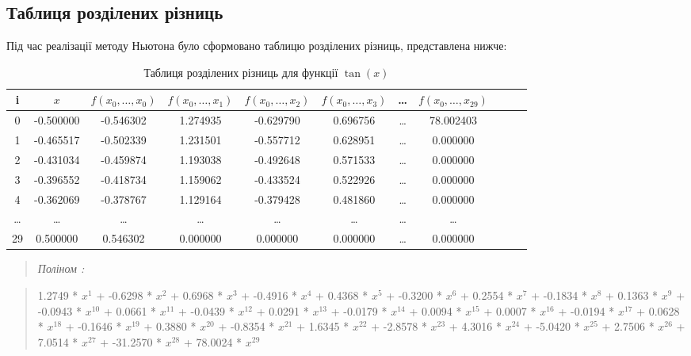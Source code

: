 \documentclass[a4paper, 12pt]{article}
\begin{document}
\subsection{Таблиця розділених різниць}

Під час реалізації методу Ньютона було сформовано таблицю розділених різниць, представлена нижче:

\begin{table}[h]
    \centering
    \begin{tabular}{|c|c|c|c|c|c|c|c|c|c|c|}
        \hline
        \textbf{i} & \( x \) & \( f(x_0, \ldots, x_0) \) & \( f(x_0, \ldots, x_1) \) & \( f(x_0, \ldots, x_2) \) & \( f(x_0, \ldots, x_3) \) & \ldots & \( f(x_0, \ldots, x_{29}) \) \\
        \hline
        0 & -0.500000 & -0.546302 & 1.274935 & -0.629790 & 0.696756 & \ldots & 78.002403 \\
        1 & -0.465517 & -0.502339 & 1.231501 & -0.557712 & 0.628951 & \ldots & 0.000000 \\
        2 & -0.431034 & -0.459874 & 1.193038 & -0.492648 & 0.571533 & \ldots & 0.000000 \\
        3 & -0.396552 & -0.418734 & 1.159062 & -0.433524 & 0.522926 & \ldots & 0.000000 \\
        4 & -0.362069 & -0.378767 & 1.129164 & -0.379428 & 0.481860 & \ldots & 0.000000 \\
        \hline
		\ldots & \ldots & \ldots & \ldots & \ldots & \ldots & \ldots & \ldots \\
        \hline
        29 & 0.500000 & 0.546302 & 0.000000 & 0.000000 & 0.000000 & \ldots & 0.000000 \\
        \hline
    \end{tabular}
    \caption{Таблиця розділених різниць для функції \( \tan(x) \)}
\end{table}

\begin{quote}
\textit{Поліном :} 
\end{quote}

\begin{quote}
1.2749 * \( x^1 \) + -0.6298 * \( x^2 \) + 0.6968 * \( x^3 \) + -0.4916 * \( x^4 \) + 0.4368 * \( x^5 \) + -0.3200 * \( x^6 \) + 0.2554 * \( x^7 \) + -0.1834 * \( x^8 \) + 0.1363 * \( x^9 \) + -0.0943 * \( x^{10} \) + 0.0661 * \( x^{11} \) + -0.0439 * \( x^{12} \) + 0.0291 * \( x^{13} \) + -0.0179 * \( x^{14} \) + 0.0094 * \( x^{15} \) + 0.0007 * \( x^{16} \) + -0.0194 * \( x^{17} \) + 0.0628 * \( x^{18} \) + -0.1646 * \( x^{19} \) + 0.3880 * \( x^{20} \) + -0.8354 * \( x^{21} \) + 1.6345 * \( x^{22} \) + -2.8578 * \( x^{23} \) + 4.3016 * \( x^{24} \) + -5.0420 * \( x^{25} \) + 2.7506 * \( x^{26} \) + 7.0514 * \( x^{27} \) + -31.2570 * \( x^{28} \) + 78.0024 * \( x^{29} \)
\end{quote}
\end{document}
